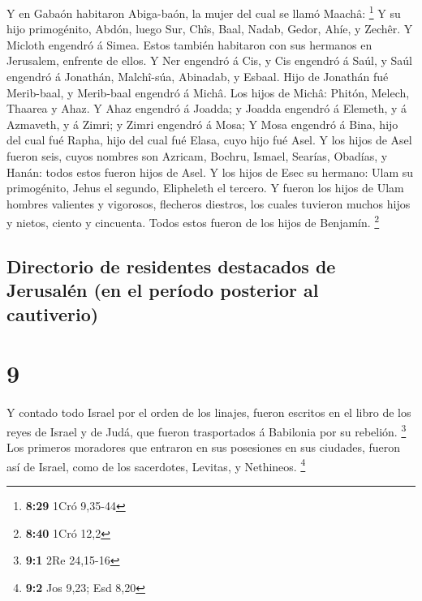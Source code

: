  Y en Gabaón habitaron Abiga-baón, la mujer del cual se
llamó Maachâ: \footnote{\textbf{8:29} 1Cró 9,35-44}  Y su
hijo primogénito, Abdón, luego Sur, Chîs, Baal, Nadab, 
Gedor, Ahíe, y Zechêr.  Y Micloth engendró á Simea. Estos
también habitaron con sus hermanos en Jerusalem, enfrente de ellos.
 Y Ner engendró á Cis, y Cis engendró á Saúl, y Saúl
engendró á Jonathán, Malchî-súa, Abinadab, y Esbaal. 
Hijo de Jonathán fué Merib-baal, y Merib-baal engendró á Michâ.
 Los hijos de Michâ: Phitón, Melech, Thaarea y Ahaz.
 Y Ahaz engendró á Joadda; y Joadda engendró á Elemeth, y
á Azmaveth, y á Zimri; y Zimri engendró á Mosa;  Y Mosa
engendró á Bina, hijo del cual fué Rapha, hijo del cual fué Elasa, cuyo
hijo fué Asel.  Y los hijos de Asel fueron seis, cuyos
nombres son Azricam, Bochru, Ismael, Searías, Obadías, y Hanán: todos
estos fueron hijos de Asel.  Y los hijos de Esec su
hermano: Ulam su primogénito, Jehus el segundo, Elipheleth el tercero.
 Y fueron los hijos de Ulam hombres valientes y
vigorosos, flecheros diestros, los cuales tuvieron muchos hijos y
nietos, ciento y cincuenta. Todos estos fueron de los hijos de Benjamín.
\footnote{\textbf{8:40} 1Cró 12,2}

\hypertarget{directorio-de-residentes-destacados-de-jerusaluxe9n-en-el-peruxedodo-posterior-al-cautiverio}{%
\subsection{Directorio de residentes destacados de Jerusalén (en el
período posterior al
cautiverio)}\label{directorio-de-residentes-destacados-de-jerusaluxe9n-en-el-peruxedodo-posterior-al-cautiverio}}

\hypertarget{section-8}{%
\section{9}\label{section-8}}

 Y contado todo Israel por el orden de los linajes, fueron
escritos en el libro de los reyes de Israel y de Judá, que fueron
trasportados á Babilonia por su rebelión. \footnote{\textbf{9:1} 2Re
  24,15-16}  Los primeros moradores que entraron en sus
posesiones en sus ciudades, fueron así de Israel, como de los
sacerdotes, Levitas, y Nethineos. \footnote{\textbf{9:2} Jos 9,23; Esd
  8,20}

